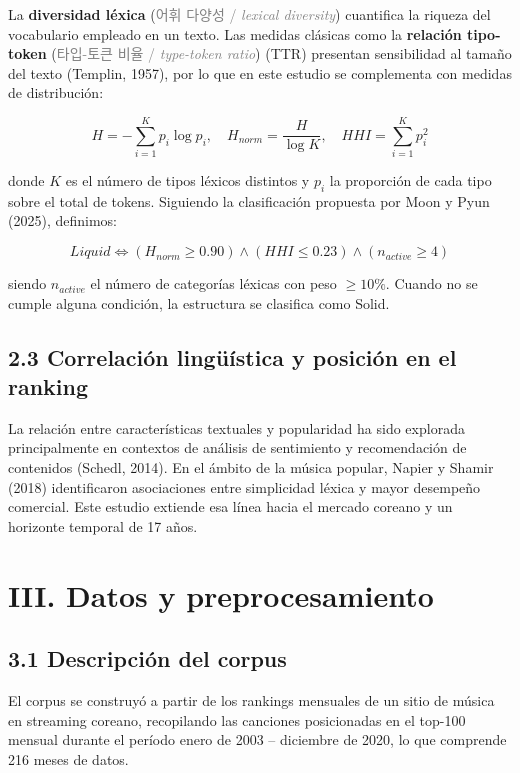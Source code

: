 \documentclass[11pt,a4paper]{article}
\newcommand{\term}[3]{\textbf{#1} (\textcolor{gray}{#2 / \textit{#3}})}
\begin{document}
La \term{diversidad léxica}{어휘 다양성}{lexical diversity} cuantifica la riqueza
del vocabulario empleado en un texto.
Las medidas clásicas como la \term{relación tipo-token}{타입-토큰 비율}{type-token ratio}
(TTR) presentan sensibilidad al tamaño del texto (Templin, 1957), por lo que en
este estudio se complementa con medidas de distribución:

\[
H = -\sum_{i=1}^{K} p_i \log p_i, \quad
H_{norm} = \frac{H}{\log K}, \quad
\mathit{HHI} = \sum_{i=1}^{K} p_i^2
\]

donde $K$ es el número de tipos léxicos distintos y $p_i$ la proporción
de cada tipo sobre el total de tokens.
Siguiendo la clasificación propuesta por Moon y Pyun (2025), definimos:

\[
\mathit{Liquid} \Longleftrightarrow
(H_{norm} \geq 0.90) \wedge (\mathit{HHI} \leq 0.23) \wedge (n_{active} \geq 4)
\]

siendo $n_{active}$ el número de categorías léxicas con peso $\geq 10\%$.
Cuando no se cumple alguna condición, la estructura se clasifica como Solid.

\subsection*{2.3 Correlación lingüística y posición en el ranking}

La relación entre características textuales y popularidad ha sido explorada
principalmente en contextos de análisis de sentimiento y recomendación de contenidos
(Schedl, 2014).
En el ámbito de la música popular, Napier y Shamir (2018) identificaron
asociaciones entre simplicidad léxica y mayor desempeño comercial.
Este estudio extiende esa línea hacia el mercado coreano y un horizonte
temporal de 17 años.

\section*{III. Datos y preprocesamiento}

\subsection*{3.1 Descripción del corpus}

El corpus se construyó a partir de los rankings mensuales de un sitio de
música en streaming coreano, recopilando las canciones posicionadas en el
top-100 mensual durante el período enero de 2003 -- diciembre de 2020,
lo que comprende 216 meses de datos.
\end{document}
